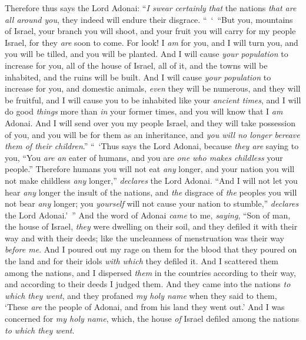 \begin{biblechapter}
\verse Therefore thus says the Lord Adonai: “\textit{I swear} \textit{certainly} \textit{that} the nations \textit{that are all around you}, they indeed will endure their disgrace.
\verse “ ‘ “But you, mountains of Israel, your branch you will shoot, and your fruit you will carry for my people Israel, for they \textit{are} soon to come.
\verse For look! I \textit{am} for you, and I will turn you, and you will be tilled, and you will be planted.
\verse And I will cause \textit{your population} to increase for you, all of the house of Israel, all of it, and the towns will be inhabited, and the ruins will be built.
\verse And I will cause \textit{your population} to increase for you, and domestic animals, \textit{even} they will be numerous, and they will be fruitful, and I will cause you to be inhabited like your \textit{ancient times}, and I will do good \textit{things} more than \textit{in} your former times, and you will know that I \textit{am} Adonai.
\verse And I will send over you my people Israel, and they will take possession of you, and you will be for them as an inheritance, and \textit{you will no longer bereave them of their children}.”
\verse “ ‘Thus says the Lord Adonai, because \textit{they are} saying to you, “You \textit{are} \textit{an} eater of humans, and you are \textit{one who makes childless} your people.”
\verse Therefore humans you will not eat \textit{any} longer, and your nation you will not make childless \textit{any} longer,” \textit{declares} the Lord Adonai.
\verse “And I will not let you hear \textit{any} longer the insult of the nations, and \textit{the} disgrace of \textit{the} peoples you will not bear \textit{any} longer; you \textit{yourself} will not cause your nation to stumble,” \textit{declares} the Lord Adonai.’ ”
\verse And the word of Adonai \textit{came} to me, \textit{saying},
\verse “Son of man, the house of Israel, \textit{they} were dwelling on their soil, and they defiled it with their way and with their deeds; like the uncleanness of menstruation was their way \textit{before me}.
\verse And I poured out my rage on them for the blood that they poured on the land and for their idols \textit{with which} they defiled it.
\verse And I scattered them among the nations, and I dispersed \textit{them} in the countries according to their way, and according to their deeds I judged them.
\verse And they came into the nations \textit{to which they went}, and they profaned \textit{my holy name} when they said to them, ‘These \textit{are} the people of Adonai, and from his land they went out.’
\verse And I was concerned for \textit{my holy name}, which, the house \textit{of} Israel defiled among the nations \textit{to which they went}.

\end{biblechapter}
